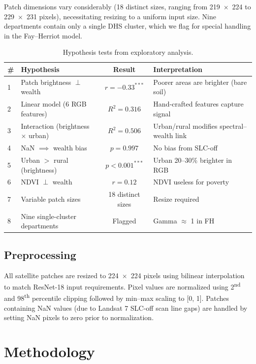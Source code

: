\documentclass[11pt,a4paper]{article}
\begin{document}
Patch dimensions vary considerably (18 distinct sizes, ranging from 219~$\times$~224 to 229~$\times$~231 pixels), necessitating resizing to a uniform input size. Nine departments contain only a single DHS cluster, which we flag for special handling in the Fay--Herriot model.

\begin{table}[ht]
\centering
\caption{Hypothesis tests from exploratory analysis.}
\label{tab:hypotheses}
\small
\begin{tabular}{lp{3.2cm}cp{5cm}}
\toprule
\# & Hypothesis & Result & Interpretation \\
\midrule
1 & Patch brightness $\perp$ wealth & $r = -0.33^{***}$ & Poorer areas are brighter (bare soil) \\
2 & Linear model (6 RGB features) & $R^2 = 0.316$ & Hand-crafted features capture signal \\
3 & Interaction (brightness $\times$ urban) & $R^2 = 0.506$ & Urban/rural modifies spectral--wealth link \\
4 & NaN $\implies$ wealth bias & $p = 0.997$ & No bias from SLC-off \\
5 & Urban $>$ rural (brightness) & $p < 0.001^{***}$ & Urban 20--30\% brighter in RGB \\
6 & NDVI $\perp$ wealth & $r = 0.12$ & NDVI useless for poverty \\
7 & Variable patch sizes & 18 distinct sizes & Resize required \\
8 & Nine single-cluster departments & Flagged & Gamma $\approx$ 1 in FH \\
\bottomrule
\end{tabular}
\end{table}

\subsection{Preprocessing}
All satellite patches are resized to 224~$\times$~224 pixels using bilinear interpolation to match ResNet-18 input requirements. Pixel values are normalized using 2\textsuperscript{nd} and 98\textsuperscript{th} percentile clipping followed by min--max scaling to [0, 1]. Patches containing NaN values (due to Landsat 7 SLC-off scan line gaps) are handled by setting NaN pixels to zero prior to normalization.

\section{Methodology}
\label{sec:method}
\end{document}
